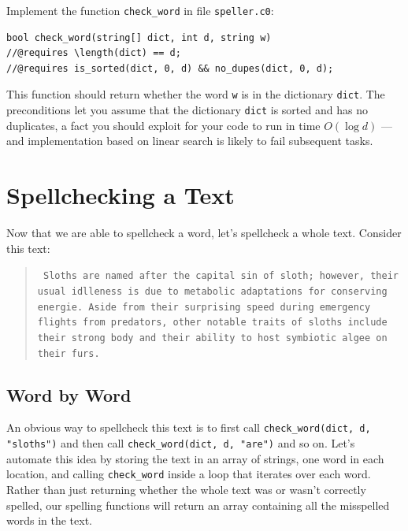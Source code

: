 \documentclass[12pt]{exam}
\begin{document}
\begin{task}[2]
Implement the function \lstinline'check_word' in file
\lstinline'speller.c0':
\begin{lstlisting}[basicstyle=\smallbasicstyle]
bool check_word(string[] dict, int d, string w)
//@requires \length(dict) == d;
//@requires is_sorted(dict, 0, d) && no_dupes(dict, 0, d);
\end{lstlisting}
This function should return whether the word \lstinline'w' is in the
dictionary \lstinline'dict'. The preconditions let you assume that the
dictionary \lstinline'dict' is sorted and has no duplicates, a fact
you should exploit for your code to run in time $O(\log d)$ --- and
implementation based on linear search is likely to fail subsequent
tasks.
\end{task}


\section{Spellchecking a Text}

Now that we are able to spellcheck a word, let's spellcheck a whole
text.  Consider this text:

\begin{quote}\sloppypar\tt\small
  Sloths are named after the capital sin of sloth; however, their
  usual idlleness is due to metabolic adaptations for conserving
  energie. Aside from their surprising speed during emergency flights
  from predators, other notable traits of sloths include their strong
  body and their ability to host symbiotic algee on their furs.
\end{quote}

\subsection{Word by Word}

An obvious way to spellcheck this text is to first call
\lstinline'check_word(dict, d, "sloths")' and then call
\lstinline'check_word(dict, d, "are")' and so on.  Let's automate this
idea by storing the text in an array of strings, one word in each
location, and calling \lstinline'check_word' inside a loop that
iterates over each word.  Rather than just returning whether the whole
text was or wasn't correctly spelled, our spelling functions will
return an array containing all the misspelled words in the text.
\end{document}
